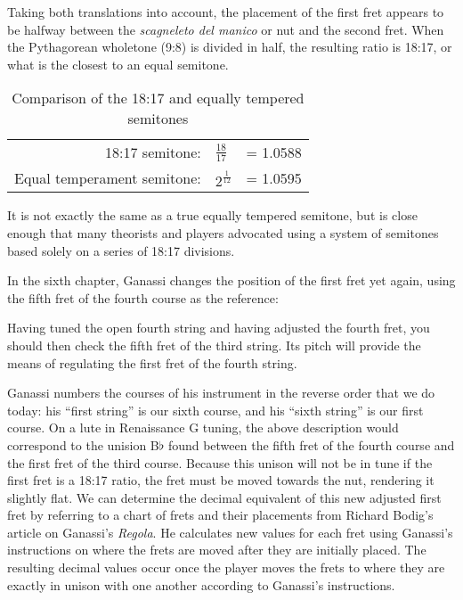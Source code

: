 Taking both translations into account, the placement of the first fret appears to be
halfway between the \textit{scagneleto del manico} or nut and the second fret.  When
the Pythagorean wholetone (9:8) is divided in half, the resulting ratio is 18:17, or
what is the closest to an equal semitone.
\begin{table}[h!]
    \begin{center}
    \begin{tabular}{ r l l }
        18:17 semitone:             & $ \frac{18}{17}  $ & = 1.0588 \\
        Equal temperament semitone: & $ 2^\frac{1}{12} $ & = 1.0595 \\
    \end{tabular}
    \end{center}
    \caption{Comparison of the 18:17 and equally tempered semitones}
\end{table}
It is not exactly the same as a true equally tempered semitone, but is close enough
that many theorists and players advocated using a system of semitones based solely on a
series of 18:17 divisions.

In the sixth chapter, Ganassi changes the position of the first fret yet again,
using the fifth fret of the fourth course as the reference:
\begin{blocks}
Having tuned the open fourth string and having adjusted the fourth fret, you should
then check the fifth fret of the third string. Its pitch will provide the means of
regulating the first fret of the fourth string. \autocite[114]{RB:2}
\end{blocks}
Ganassi numbers the courses of his instrument in the reverse order that we do
today: his ``first string'' is our sixth course, and his ``sixth string'' is our
first course. On a lute in Renaissance G tuning, the  above description would
correspond to the unision B$\flat$ found between the fifth fret of the fourth
course and the first fret of the third course. Because this unison will not be
in tune if the first fret is a 18:17 ratio, the fret must be moved towards the
nut, rendering it slightly flat. We can determine the  decimal equivalent of
this new adjusted first fret by referring to a chart of frets and their
placements from Richard Bodig's article on Ganassi's \textit{Regola}.
\autocite[67]{RB:3} He calculates new values for each fret using Ganassi's
instructions on where the frets are moved after they are initially placed. The
resulting decimal values occur once the player moves the frets to where they are
exactly in unison with one another according to Ganassi's instructions.

